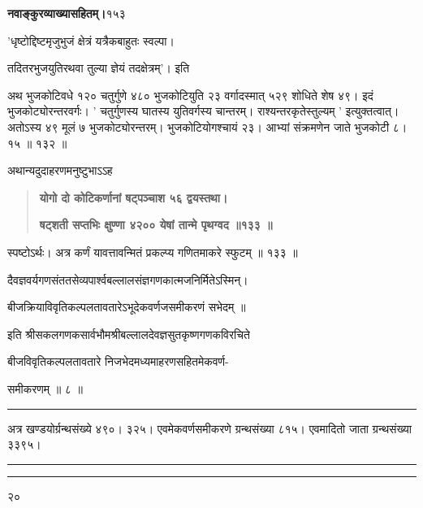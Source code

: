 \documentclass[11pt, openany]{book}
\begin{document}
\onehalfspacing
\hspace{2in}\textbf{नवाङ्कुरव्याख्यासहितम्।}\hspace{2in}१५३

\vspace{5mm}

\begin{sloppypar}
\begin{center}
'धृष्टोद्दिष्टमृजुभुजं क्षेत्रं यत्रैकबाहुतः स्वल्पा।

तदितरभुजयुतिरथवा तुल्या ज्ञेयं तदक्षेत्रम्'। इति
\end{center}

\hangindent=0.2in \hspace{0.2in}अथ भुजकोटिवधे १२० चतुर्गुणे ४८० भुजकोटियुति २३ वर्गादस्मात् ५२९ शोधिते शेष ४९। इदं भुजकोट्योरन्तरवर्गः। ' चतुर्गुणस्य घातस्य युतिवर्गस्य चान्तरम्। राश्यन्तरकृतेस्तुल्यम् ' इत्युक्तत्वात्। अतोऽस्य ४९ मूलं ७ भुजकोट्योरन्तरम्। भुजकोटियोगश्चायं २३। आभ्यां संक्रमणेन जाते भुजकोटी ८।१५ ॥ १३२ ॥

\hangindent=0.2in \hspace{0.2in}अथान्यदुदाहरणमनुष्टुभाऽऽह\textendash

\begin{quote}
\hspace{1in}\textbf{योगो दो कोटिकर्णानां षट्पञ्चाश ५६ द्वयस्तथा।}

\hspace{1in}\textbf{षट्शती सप्तभिः क्षुण्णा ४२०० येषां तान्मे पृथग्वद ॥१३३ ॥}
\end{quote}

\hangindent=0.2in \hspace{0.4in}स्पष्टोऽर्थः। अत्र कर्णं यावत्तावन्मितं प्रकल्प्य गणितमाकरे स्फुटम् ॥ १३३ ॥

\begin{center}
दैवज्ञवर्यगणसंततसेव्यपार्श्वबल्लालसंज्ञगणकात्मजनिर्मितेऽस्मिन्।

बीजक्रियाविवृतिकल्पलतावतारेऽभूदेकवर्णजसमीकरणं सभेदम् ॥

इति श्रीसकलगणकसार्वभौमश्रीबल्लालदेवज्ञसुतकृष्णगणकविरचिते

बीजविवृतिकल्पलतावतारे निजभेदमध्यमाहरणसहितमेकवर्ण-

समीकरणम् ॥ ८ ॥

\vspace{2mm}   

\rule{0.1\linewidth}{0.5pt}

\vspace{5mm}

अत्र खण्डयोर्ग्रन्थसंख्ये ४९०। ३२५। एवमेकवर्णसमीकरणे ग्रन्थसंख्या ८१५। एवमादितो जाता ग्रन्थसंख्या ३३९५।

\vspace{2cm}

\rule{0.1\linewidth}{0.5pt}

\vspace{-5mm}

\rule{0.1\linewidth}{0.5pt}
\end{center}
२०
\end{sloppypar}
\thispagestyle{empty}
\newpage
\end{document}

